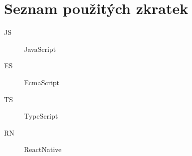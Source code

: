 \chapter*{Seznam použitých zkratek}

\begin{multicols}{2}
\raggedright
\begin{description}
\item [JS] JavaScript
\item [ES] EcmaScript
\item [TS] TypeScript
\item [RN] ReactNative
\end{description}
\end{multicols}

